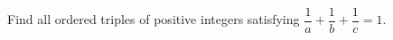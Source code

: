 Find all ordered triples of positive integers satisfying $\dfrac{1}{a}+\dfrac{1}{b}+\dfrac{1}{c}=1 $.
